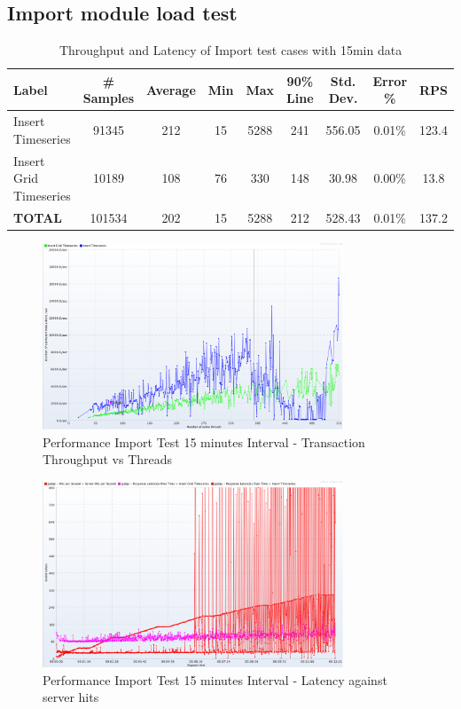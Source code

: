 \subsection{Import module load test}
\begin{table}[]
\begin{tabulary}{\linewidth}{|L|C|C|C|C|C|C|C|C|}
\hline
Label & \# Samples & Average & Min & Max & 90\% Line & Std. Dev. & Error \% & RPS \\ \hline
Insert Timeseries & 91345 & 212 & 15 & 5288 & 241 & 556.05 & 0.01\% & 123.4 \\ \hline
Insert Grid Timeseries & 10189 & 108 & 76 & 330 & 148 & 30.98 & 0.00\% & 13.8 \\ \hline
\textbf{TOTAL} & 101534 & 202 & 15 & 5288 & 212 & 528.43 & 0.01\% & 137.2 \\ \hline
\end{tabulary}
\caption{Throughput and Latency of Import test cases with 15min data}
\label{tab:obs_import_15_min_summary}
\end{table}

\begin{figure}[htp]
    \centering
    \includegraphics[width=0.8\textwidth]{results/obs/import/obs_import_15m_transaction_throughtput_vs_threads.png}
    \caption{Performance Import Test 15 minutes Interval - Transaction Throughput vs Threads}
    \label{fi:test_obs_import_15m_throughtput}
\end{figure}

\begin{figure}[htp]
    \centering
    \includegraphics[width=0.8\textwidth]{results/obs/import/obs_import_15m_res_latencies_against_hits.png}
    \caption{Performance Import Test 15 minutes Interval - Latency against server hits}
    \label{fi:test_obs_import_15m_latency}
\end{figure}



